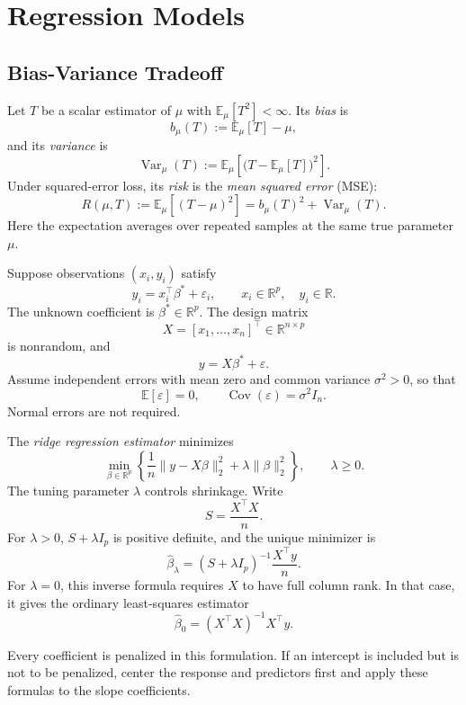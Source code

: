\section{Regression Models}

\subsection{Bias-Variance Tradeoff}

\begin{definition}
Let $T$ be a scalar estimator of $\mu$ with
$\mathbb{E}_\mu[T^2]<\infty$. Its \emph{bias} is
\[
b_\mu(T):=\mathbb{E}_\mu[T]-\mu,
\]
and its \emph{variance} is
\[
\operatorname{Var}_\mu(T)
:=
\mathbb{E}_\mu\!\left[
\bigl(T-\mathbb{E}_\mu[T]\bigr)^2
\right].
\]
Under squared-error loss, its \emph{risk} is the
\emph{mean squared error} (MSE):
\[
R(\mu,T)
:=
\mathbb{E}_\mu[(T-\mu)^2]
=
b_\mu(T)^2+\operatorname{Var}_\mu(T).
\]
Here the expectation averages over repeated samples at the
same true parameter $\mu$.
\end{definition}

\begin{definition}
Suppose observations $(x_i,y_i)$ satisfy
\[
y_i=x_i^\top\beta^\ast+\varepsilon_i,
\qquad
x_i\in\mathbb{R}^p,\quad y_i\in\mathbb{R}.
\]
The unknown coefficient is $\beta^\ast\in\mathbb{R}^p$.
The design matrix
\[
X=[x_1,\ldots,x_n]^\top\in\mathbb{R}^{n\times p}
\]
is nonrandom, and
\[
y=X\beta^\ast+\varepsilon.
\]
Assume independent errors with mean zero and common variance
$\sigma^2>0$, so that
\[
\mathbb{E}[\varepsilon]=0,
\qquad
\operatorname{Cov}(\varepsilon)=\sigma^2 I_n.
\]
Normal errors are not required.

The \emph{ridge regression estimator} minimizes
\[
\min_{\beta\in\mathbb{R}^p}
\left\{
\frac{1}{n}\|y-X\beta\|_2^2
+\lambda\|\beta\|_2^2
\right\},
\qquad \lambda\geq0.
\]
The tuning parameter $\lambda$ controls shrinkage. Write
\[
S=\frac{X^\top X}{n}.
\]
For $\lambda>0$, $S+\lambda I_p$ is positive definite, and the
unique minimizer is
\[
\widehat\beta_\lambda
=
(S+\lambda I_p)^{-1}\frac{X^\top y}{n}.
\]
For $\lambda=0$, this inverse formula requires $X$ to have full
column rank. In that case, it gives the ordinary least-squares
estimator
\[
\widehat\beta_0=(X^\top X)^{-1}X^\top y.
\]

Every coefficient is penalized in this formulation. If an intercept
is included but is not to be penalized, center the response and
predictors first and apply these formulas to the slope coefficients.
\end{definition}

